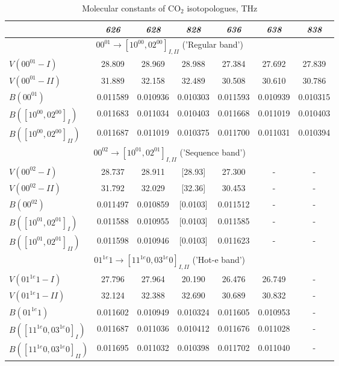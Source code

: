\documentclass{report}
\begin{document}
\begin{appendices}
\begin{table}
\centering
\caption{Molecular constants of CO$_2$ isotopologues, THz}
\label{table:VB}
\footnotesize
\begin{tabular}{|l|cccccc|}
\hline
& \textit{626} & \textit{628} & \textit{828} & \textit{636} & \textit{638} & \textit{838}\\
\hline
\multicolumn{7}{|c|}{$00^01\rightarrow[10^00,02^00]_{I,II}$ ('Regular band')}\\
\hline
$V(00^01-I)$            & 28.809 & 28.969 & 28.988 & 27.384 & 27.692 & 27.839\\
$V(00^01-II)$           & 31.889 & 32.158 & 32.489 & 30.508 & 30.610 & 30.786\\
$B(00^01)$              & 0.011589 & 0.010936 & 0.010303 & 0.011593 & 0.010939 & 0.010315\\
$B([10^00,02^00]_I)$    & 0.011683 & 0.011034 & 0.010403 & 0.011668 & 0.011019 & 0.010403\\
$B([10^00,02^00]_{II})$ & 0.011687 & 0.011019 & 0.010375 & 0.011700 & 0.011031 & 0.010394\\
\hline
\multicolumn{7}{|c|}{$00^02\rightarrow[10^01,02^01]_{I,II}$ ('Sequence band')}\\
\hline
$V(00^02-I)$            & 28.737 & 28.911 & [28.93] & 27.300 & - & -\\
$V(00^02-II)$           & 31.792 & 32.029 &[32.36] & 30.453 & - & -\\
$B(00^02)$              & 0.011497 & 0.010859 & [0.0103] & 0.011512 & - & -\\
$B([10^01,02^01]_I)$    & 0.011588 & 0.010955 & [0.0103] & 0.011585 & - & -\\
$B([10^01,02^01]_{II})$ & 0.011598 & 0.010946 & [0.0103] & 0.011623 & - & -\\
\hline
\multicolumn{7}{|c|}{$01^{1e}1\rightarrow[11^{1e}0,03^{1e}0]_{I,II}$ ('Hot-e band')}\\
\hline
$V(01^{1e}1-I)$               & 27.796 & 27.964 & 20.190 & 26.476 & 26.749 & -\\
$V(01^{1e}1-II)$              & 32.124 & 32.388 & 32.690 & 30.689 & 30.832 & -\\
$B(01^{1e}1)$                 & 0.011602 & 0.010949 & 0.010324 & 0.011605 & 0.010953 & -\\
$B([11^{1e}0,03^{1e}0]_I)$    & 0.011687 & 0.011036 & 0.010412 & 0.011676 & 0.011028 & -\\
$B([11^{1e}0,03^{1e}0]_{II})$ & 0.011695 & 0.011032 & 0.010398 & 0.011702 & 0.011040 & -\\

\end{tabular}
\end{table}
\end{appendices}
\end{document}
